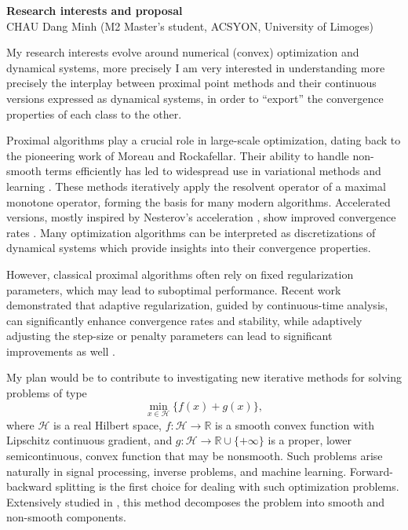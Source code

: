 \documentclass[12pt]{article}
\begin{document}
\begin{center}

  {\Large{\bf Research interests and proposal}}\\

  CHAU Dang Minh (M2 Master's student, ACSYON, University of Limoges)\\
\end{center}

My research interests evolve around numerical (convex) optimization and dynamical systems, more precisely I am very interested in understanding more precisely the interplay between proximal point methods and their continuous versions expressed as dynamical systems, in order to ``export'' the convergence properties of each class to the other.

Proximal algorithms play a crucial role in large-scale optimization, dating back to the pioneering work of Moreau and Rockafellar. Their ability to handle non-smooth terms efficiently has led to widespread use in variational methods and learning \cite{Bach2012}. These methods iteratively apply the resolvent operator of a maximal monotone operator, forming the basis for many modern algorithms. Accelerated versions, mostly inspired by Nesterov's acceleration \cite{Nesterov1983}, show improved convergence rates \cite{Beck2009, Attouch2016, Apidopoulos2018}. Many optimization algorithms can be interpreted as discretizations of dynamical systems \cite{SBC, Attouch2013} which provide insights into their convergence properties.

However, classical proximal algorithms often rely on fixed regularization parameters, which may lead to suboptimal performance. Recent work \cite{Attouch2013,ACFR,SDJS}  demonstrated that adaptive regularization, guided by continuous-time analysis, can significantly enhance convergence rates and stability, while  adaptively adjusting the step-size or penalty parameters can lead to significant improvements as well \cite{Xu2021}.

My plan would be to contribute to investigating new iterative methods for solving problems of type
$$
  \min_{x \in \mathcal{H}} \{ f(x) + g(x) \},
$$
where $\mathcal{H}$ is a real Hilbert space, $f: \mathcal{H} \to \mathbb{R}$ is a smooth convex function with Lipschitz continuous gradient, and $g: \mathcal{H} \to \mathbb{R} \cup \{+\infty\}$ is a proper, lower semicontinuous, convex function that may be nonsmooth. Such problems arise naturally in signal processing, inverse problems, and machine learning.
Forward-backward splitting is the first choice for dealing with such optimization problems. Extensively studied in \cite{Beck2009, Bauschke2011, AAD2}, this method decomposes the problem into smooth and non-smooth components.
\end{document}
